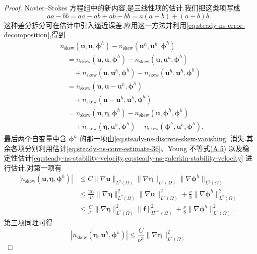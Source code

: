 \begin{proof}
Navier--Stokes 方程组中的新内容,是三线性项的估计.我们把这类项写成
\[
  aa-bb=aa-ab+ab-bb=a(a-b)+(a-b)b.
\]
这种差分拆分可在估计中引入逼近误差.应用这一方法并利用\cref{eq:steady-ns-error-decomposition},得到
\begin{equation}\label{eq:steady-ns-error-convection-splitting}
\begin{aligned}
  &n_{\mathrm{skew}}(\bm{u},\bm{u},\symbf{\phi}^h)
    -n_{\mathrm{skew}}(\bm{u}^h,\bm{u}^h,\symbf{\phi}^h)\\
  &\quad=n_{\mathrm{skew}}(\bm{u},\bm{u},\symbf{\phi}^h)
          -n_{\mathrm{skew}}(\bm{u},\bm{u}^h,\symbf{\phi}^h)\\
  &\qquad+n_{\mathrm{skew}}(\bm{u},\bm{u}^h,\symbf{\phi}^h)
          -n_{\mathrm{skew}}(\bm{u}^h,\bm{u}^h,\symbf{\phi}^h)\\
  &\quad=n_{\mathrm{skew}}(\bm{u},\bm{u}-\bm{u}^h,\symbf{\phi}^h)\\
  &\qquad+n_{\mathrm{skew}}(\bm{u}-\bm{u}^h,\bm{u}^h,\symbf{\phi}^h)\\
  &\quad=n_{\mathrm{skew}}(\bm{u},\symbf{\eta},\symbf{\phi}^h)
          -n_{\mathrm{skew}}(\bm{u},\symbf{\phi}^h,\symbf{\phi}^h)\\
  &\qquad+n_{\mathrm{skew}}(\symbf{\eta},\bm{u}^h,\symbf{\phi}^h)
          -n_{\mathrm{skew}}(\symbf{\phi}^h,\bm{u}^h,\symbf{\phi}^h).
\end{aligned}
\end{equation}
最后两个自变量中含 $\symbf{\phi}^h$ 的那一项由\cref{eq:steady-ns-discrete-skew-vanishing} 消失.其余各项分别利用估计\cref{eq:steady-ns-conv-estimate-36}、Young 不等式\hyperref[eq:appendix-a-5]{(A.5)} 以及稳定性估计\cref{eq:steady-ns-stability-velocity,eq:steady-ns-galerkin-stability-velocity} 进行估计.对第一项有
\[
\begin{aligned}
 |n_{\mathrm{skew}}(\bm{u},\symbf{\eta},\symbf{\phi}^h)|
   &\le C\|\nabla\bm{u}\|_{L^2(\Omega)}
          \|\nabla\symbf{\eta}\|_{L^2(\Omega)}
          \|\nabla\symbf{\phi}^h\|_{L^2(\Omega)}\\
   &\le\frac{2C}{\nu}\|\nabla\symbf{\eta}\|_{L^2(\Omega)}^2
          \|\nabla\bm{u}\|_{L^2(\Omega)}^2
       +\frac{\nu}{8}\|\nabla\symbf{\phi}^h\|_{L^2(\Omega)}^2\\
   &\le\frac{C}{\nu^3}\|\nabla\symbf{\eta}\|_{L^2(\Omega)}^2
          \|\bm{f}\|_{H^{-1}(\Omega)}^2
       +\frac{\nu}{8}\|\nabla\symbf{\phi}^h\|_{L^2(\Omega)}^2.
\end{aligned}
\]
第三项同理可得
\[
  |n_{\mathrm{skew}}(\symbf{\eta},\bm{u}^h,\symbf{\phi}^h)|
    \le\frac{C}{\nu^3}\|\nabla\symbf{\eta}\|_{L^2(\Omega)}^2
\]
\end{proof}
